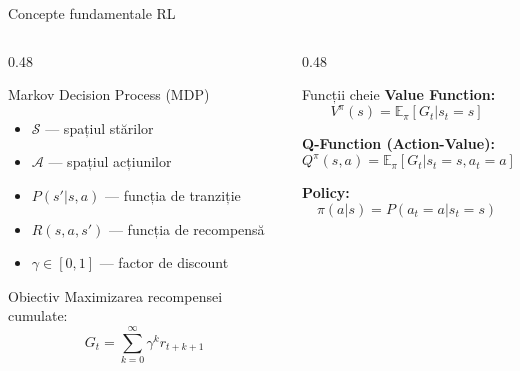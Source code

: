 \documentclass[aspectratio=169]{beamer}
\begin{document}
\begin{frame}{Concepte fundamentale RL}
  \begin{columns}[T]
    \begin{column}{0.48\textwidth}
      \begin{block}{Markov Decision Process (MDP)}
        \begin{itemize}
          \item $\mathcal{S}$ — spațiul stărilor
          \item $\mathcal{A}$ — spațiul acțiunilor
          \item $P(s'|s,a)$ — funcția de tranziție
          \item $R(s,a,s')$ — funcția de recompensă
          \item $\gamma \in [0,1]$ — factor de discount
        \end{itemize}
      \end{block}
      
      \begin{block}{Obiectiv}
        Maximizarea recompensei cumulate:
        \[G_t = \sum_{k=0}^{\infty} \gamma^k r_{t+k+1}\]
      \end{block}
    \end{column}
    
    \begin{column}{0.48\textwidth}
      \begin{block}{Funcții cheie}
        \textbf{Value Function:}
        \[V^\pi(s) = \mathbb{E}_\pi[G_t | s_t = s]\]
        
        \textbf{Q-Function (Action-Value):}
        \[Q^\pi(s,a) = \mathbb{E}_\pi[G_t | s_t = s, a_t = a]\]
        
        \textbf{Policy:}
        \[\pi(a|s) = P(a_t = a | s_t = s)\]
      \end{block}
    \end{column}
  \end{columns}
\end{frame}
\end{document}
